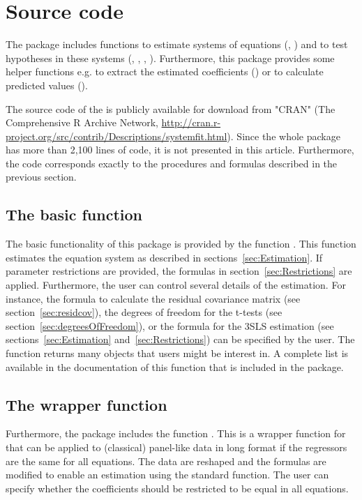 \section{Source code}\label{sec:code}

The  package includes functions
to estimate systems of equations
(, )
and to test hypotheses in these systems
(, ,
, ).
Furthermore, this package provides some helper functions
e.g. to extract the estimated coefficients ()
or to calculate predicted values ().

The source code of the  is publicly available
for download from "CRAN" (The Comprehensive R Archive Network,
\url{http://cran.r-project.org/src/contrib/Descriptions/systemfit.html}).
Since the whole package has more than 2,100 lines of code,
it is not presented in this article.
Furthermore, the code corresponds exactly to the procedures and formulas
described in the previous section.


\subsection[Basic function systemfit]{The basic function }
The basic functionality of this package is provided by the
function .
This function estimates the equation system as described
in sections~\ref{sec:Estimation}.
If parameter restrictions are provided, the formulas in
section~\ref{sec:Restrictions} are applied.
Furthermore, the user can control several details of the estimation.
For instance, the
formula to calculate the residual covariance matrix
(see section~\ref{sec:residcov}),
the degrees of freedom for the t-tests
(see section~\ref{sec:degreesOfFreedom}), or
the formula for the 3SLS estimation
(see sections~\ref{sec:Estimation} and~\ref{sec:Restrictions})
can be specified by the user.
The  function returns many objects
that users might be interest in.
A complete list is available in the documentation of this function
that is included in the package.


\subsection[Wrapper function systemfitClassic]{The wrapper function
   }
Furthermore, the  package includes the function
.
This is a wrapper function for 
that can be applied to (classical) panel-like data in long format
if the regressors are the same for all equations.
The data are reshaped and the formulas are modified to enable
an estimation using the standard  function.
The user can specify whether the coefficients should be restricted
to be equal in all equations.


